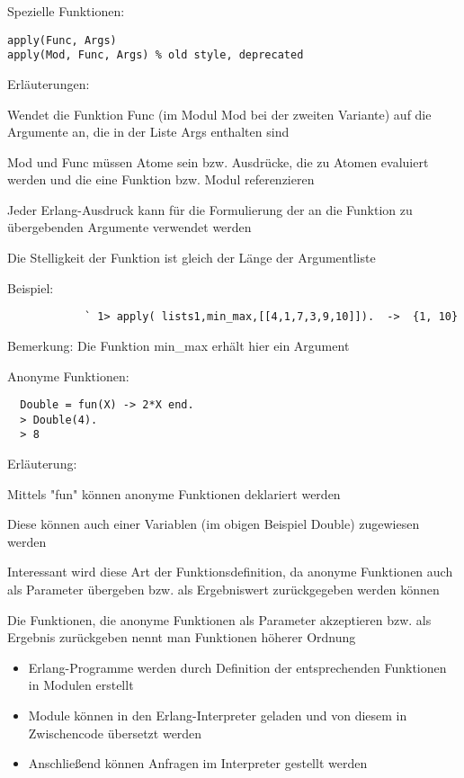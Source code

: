 \documentclass[10pt]{article}
\begin{document}
Spezielle Funktionen:
\begin{lstlisting}
apply(Func, Args)
apply(Mod, Func, Args) % old style, deprecated
\end{lstlisting}
\begin{itemize*}
  \item Erläuterungen:
  \item Wendet die Funktion Func (im Modul Mod bei der zweiten Variante) auf die Argumente an, die in der Liste Args enthalten sind
  \item Mod und Func müssen Atome sein bzw. Ausdrücke, die zu Atomen evaluiert werden und die eine Funktion bzw. Modul referenzieren
  \item Jeder Erlang-Ausdruck kann für die Formulierung der an die Funktion zu übergebenden Argumente verwendet werden
  \item Die Stelligkeit der Funktion ist gleich der Länge der Argumentliste
  \item Beispiel:
  \begin{lstlisting}
            ` 1> apply( lists1,min_max,[[4,1,7,3,9,10]]).  ->  {1, 10}
          \end{lstlisting}
  \item Bemerkung: Die Funktion min\_max erhält hier ein Argument
\end{itemize*}

Anonyme Funktionen:
\begin{lstlisting}
  Double = fun(X) -> 2*X end.
  > Double(4).
  > 8
\end{lstlisting}
\begin{itemize*}
  \item Erläuterung:
  \item Mittels "fun" können anonyme Funktionen deklariert werden
  \item Diese können auch einer Variablen (im obigen Beispiel Double) zugewiesen werden
  \item Interessant wird diese Art der Funktionsdefinition, da anonyme Funktionen auch als Parameter übergeben bzw. als Ergebniswert zurückgegeben werden können
  \item Die Funktionen, die anonyme Funktionen als Parameter akzeptieren bzw. als Ergebnis zurückgeben nennt man Funktionen höherer Ordnung
\end{itemize*}

\begin{itemize}
  \item Erlang-Programme werden durch Definition der entsprechenden Funktionen in Modulen erstellt
  \item Module können in den Erlang-Interpreter geladen und von diesem in Zwischencode übersetzt werden
  \item Anschließend können Anfragen im Interpreter gestellt werden
\end{itemize}
\end{document}
